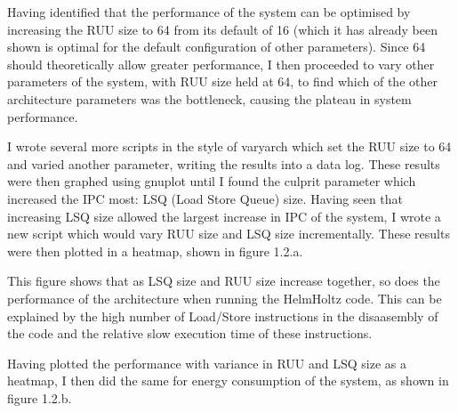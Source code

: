 \documentclass[paper=a4, fontsize=11pt]{scrartcl} %
\numberwithin{equation}{section} %
\numberwithin{figure}{section} %
\numberwithin{table}{section} %
\begin{document}
Having identified that the performance of the system can be optimised by increasing the RUU size to 64 from its default of 16 (which it has already been shown is optimal for the default configuration of other parameters).  Since 64 should theoretically allow greater performance, I then proceeded to vary other parameters of the system, with RUU size held at 64, to find which of the other architecture parameters was the bottleneck, causing the plateau in system performance.

I wrote several more scripts in the style of varyarch which set the RUU size to 64 and varied another parameter, writing the results into a data log.  These results were then graphed using gnuplot until I found the culprit parameter which increased the IPC most: LSQ (Load Store Queue) size.  Having seen that increasing LSQ size allowed the largest increase in IPC of the system, I wrote a new script which would vary RUU size and LSQ size incrementally. These results were then plotted in a heatmap, shown in figure 1.2.a.

This figure shows that as LSQ size and RUU size increase together, so does the performance of the architecture when running the HelmHoltz code.  This can be explained by the high number of Load/Store instructions in the disaasembly of the code and the relative slow execution time of these instructions.

Having plotted the performance with variance in RUU and LSQ size as a heatmap, I then did the same for energy consumption of the system, as shown in figure 1.2.b.
\end{document}

